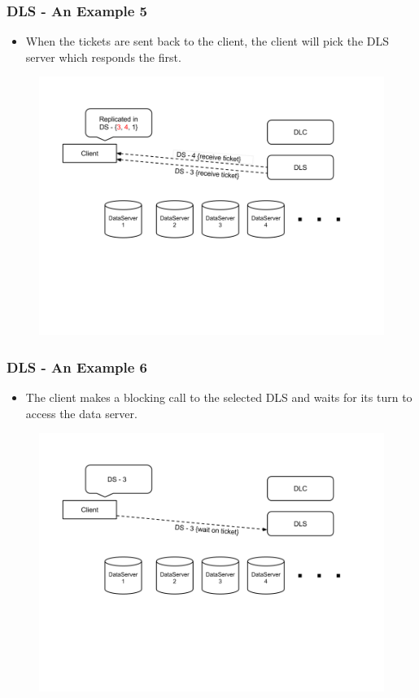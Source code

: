 \documentclass{beamer}
\begin{document}
\begin{frame}
  \frametitle{DLS - An Example 5}
  \begin{itemize}
    \item When the tickets are sent back to the client, the client will pick
      the DLS server which responds the first.
  \end{itemize}
  \begin{figure}
    \begin{center}
      \centerline{\includegraphics[scale=0.40]{img/DLS_Example6.png}}
    \end{center}
  \end{figure}
\end{frame}

\begin{frame}
  \frametitle{DLS - An Example 6}
  \begin{itemize}
    \item The client makes a blocking call to the selected DLS and waits for
      its turn to access the data server.
  \end{itemize}
  \begin{figure}
    \begin{center}
      \centerline{\includegraphics[scale=0.40]{img/DLS_Example7.png}}
    \end{center}
  \end{figure}
\end{frame}
\end{document}

